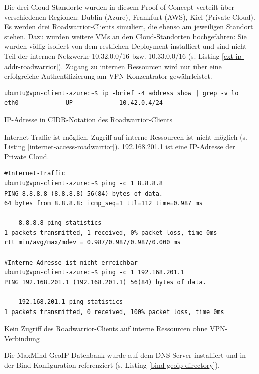Die drei Cloud-Standorte wurden in diesem Proof of Concept verteilt über verschiedenen Regionen: Dublin (Azure), Frankfurt (AWS), Kiel (Private Cloud). Es werden drei \gls{Roadwarrior}-\gls{Client}s simuliert, die ebenso am jeweiligen Standort stehen. Dazu wurden weitere \gls{VM}s an den Cloud-Standorten hochgefahren: Sie wurden völlig isoliert von dem restlichen \gls{Deployment} installiert und sind nicht Teil der internen Netzwerke 10.32.0.0/16 bzw. 10.33.0.0/16 (s. Listing \ref{ext-ip-addr-roadwarrior}). Zugang zu internen Ressourcen wird nur über eine erfolgreiche Authentifizierung am \gls{VPN-Konzentrator} gewährleistet.
\begin{listing}[h]
\begin{verbatim}
ubuntu@vpn-client-azure:~$ ip -brief -4 address show | grep -v lo
eth0             UP             10.42.0.4/24

\end{verbatim}
\caption{IP-Adresse in CIDR-Notation des Roadwarrior-Clients}
\label{ext-ip-addr-roadwarrior}
\end{listing}\FloatBarrier
Internet-Traffic ist möglich, Zugriff auf interne Ressourcen ist nicht möglich (s. Listing \ref{internet-access-roadwarrior}). 192.168.201.1 ist eine IP-Adresse der Private Cloud.
\begin{listing}[h]
\begin{verbatim}
#Internet-Traffic
ubuntu@vpn-client-azure:~$ ping -c 1 8.8.8.8
PING 8.8.8.8 (8.8.8.8) 56(84) bytes of data.
64 bytes from 8.8.8.8: icmp_seq=1 ttl=112 time=0.987 ms

--- 8.8.8.8 ping statistics ---
1 packets transmitted, 1 received, 0% packet loss, time 0ms
rtt min/avg/max/mdev = 0.987/0.987/0.987/0.000 ms

#Interne Adresse ist nicht erreichbar 
ubuntu@vpn-client-azure:~$ ping -c 1 192.168.201.1
PING 192.168.201.1 (192.168.201.1) 56(84) bytes of data.

--- 192.168.201.1 ping statistics ---
1 packets transmitted, 0 received, 100% packet loss, time 0ms

\end{verbatim}
\caption{Kein Zugriff des Roadwarrior-Clients auf interne Ressourcen ohne VPN-Verbindung}
\label{internet-access-roadwarrior}
\end{listing}\FloatBarrier
Die MaxMind \gls{GeoIP}-Datenbank wurde auf dem \gls{DNS}-Server installiert und in der Bind-Konfiguration referenziert (s. Listing \ref{bind-geoip-directory}).
